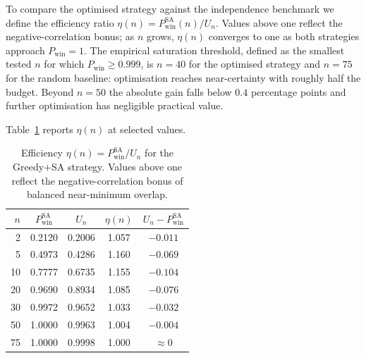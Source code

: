 To compare the optimised strategy against the independence benchmark we
define the efficiency ratio
$\eta(n) = P_{\mathrm{win}}^{\mathrm{SA}}(n) / U_n$.  Values above one
reflect the negative-correlation bonus; as $n$ grows, $\eta(n)$ converges
to one as both strategies approach $P_{\mathrm{win}} = 1$.  The empirical
saturation threshold, defined as the smallest tested $n$ for which
$P_{\mathrm{win}} \ge 0.999$, is $n = 40$ for the optimised strategy and
$n = 75$ for the random baseline: optimisation reaches near-certainty with
roughly half the budget.  Beyond $n = 50$ the absolute gain falls below
$0.4$ percentage points and further optimisation has negligible practical
value.

Table~\ref{tab:efficiency} reports $\eta(n)$ at selected values.

\begin{table}[ht]
  \centering
  \caption{Efficiency $\eta(n) = P_{\mathrm{win}}^{\mathrm{SA}} / U_n$
           for the Greedy+SA strategy.  Values above one reflect
           the negative-correlation bonus of balanced near-minimum
           overlap.}
  \label{tab:efficiency}
  \smallskip
  \begin{tabular}{@{}rcccc@{}}
    \toprule
    $n$ & $P_{\mathrm{win}}^{\mathrm{SA}}$ & $U_n$ & $\eta(n)$ & $U_n - P_{\mathrm{win}}^{\mathrm{SA}}$ \\
    \midrule
    2  & 0.2120 & 0.2006 & 1.057 & $-0.011$ \\
    5  & 0.4973 & 0.4286 & 1.160 & $-0.069$ \\
    10 & 0.7777 & 0.6735 & 1.155 & $-0.104$ \\
    20 & 0.9690 & 0.8934 & 1.085 & $-0.076$ \\
    30 & 0.9972 & 0.9652 & 1.033 & $-0.032$ \\
    50 & 1.0000 & 0.9963 & 1.004 & $-0.004$ \\
    75 & 1.0000 & 0.9998 & 1.000 & $\approx 0$ \\
    \bottomrule
  \end{tabular}
\end{table}
